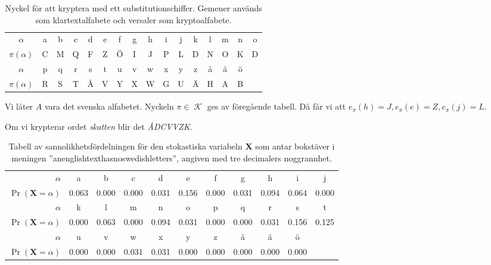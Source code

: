 \documentclass{beamer}
\theoremstyle{definition}
\DeclareMathOperator{\K}{\mathcal{K}}
\let\stoch\mathbf
\newcommand{\x}{\stoch X}
\begin{document}
\begin{frame}{\insertsubsectionhead}
  \begin{table}
    \centering\small
    \begin{tabular}{c|ccccccccccccccc}
      \toprule
      \(\alpha\) & a & b & c & d & e & f & g & h & i & j & k & l & m & n & o \\
      \(\pi(\alpha)\) 
      & C & M & Q & F & Z & Ö & I & J & P & L & D & N & O & K & D \\
      \midrule
      \(\alpha\) & p & q & r & s & t & u & v & w & x & y & z & å & ä & ö \\
      \(\pi(\alpha)\) 
      & R & S & T & Å & V & Y & X & W & G & U & Ä & H & A & B \\
      \bottomrule
    \end{tabular}
    \caption{Nyckel för att kryptera med ett substitutionschiffer.
      Gemener används som klartextalfabete och versaler som kryptoalfabete.}
    \label{tbl:Substitutionschiffer}
  \end{table}
\end{frame}

\begin{frame}{\insertsubsectionhead}
  \begin{example}
    Vi låter \(A\) vara det svenska alfabetet.
    Nyckeln \(\pi\in \K\) ges av föregående tabell.
    Då får vi att \(e_\pi(h) = J, e_\pi(e) = Z, e_\pi(j) = L\).
  \end{example}

  \begin{example}
    \label{ex:SubstitutionSkatten}
    Om vi krypterar ordet \emph{skatten} blir det \emph{ÅDCVVZK}.
  \end{example}
\end{frame}

\begin{frame}{\insertsubsectionhead}
  \begin{table}
    \centering\tiny
    \begin{tabular}{r|cccccccccc}
      \toprule
      \(\alpha\) & a & b & c & d & e & f & g & h & i & j  \\
      \(\Pr(\x = \alpha)\) & 0.063  & 0.000 & 0.000 & 0.031 & 0.156 & 0.000 
      & 0.031 & 0.094 & 0.064 & 0.000 \\
      \midrule
      \(\alpha\) & k & l & m & n & o & p & q & r & s & t \\
      \(\Pr(\x = \alpha)\) & 0.000 & 0.063 & 0.000 & 0.094 & 0.031 & 0.000 
      & 0.000 & 0.031 & 0.156 & 0.125 \\
      \midrule
      \(\alpha\) & u & v & w & x & y & z & å & ä & ö \\
      \(\Pr(\x = \alpha)\) & 0.000 & 0.000 & 0.031 & 0.031 & 0.000 & 0.000 
      & 0.000 & 0.000 & 0.000 \\
      \bottomrule
    \end{tabular}
    \caption{Tabell av sannolikhetsfördelningen för den stokastiska variabeln 
    \(\x\) som antar bokstäver i meningen ''anenglishtexthasnoswedishletters'', 
    angiven med tre decimalers noggrannhet.}
    \label{tbl:SannolikhetstabellKlartext}
  \end{table}
\end{frame}
\end{document}
